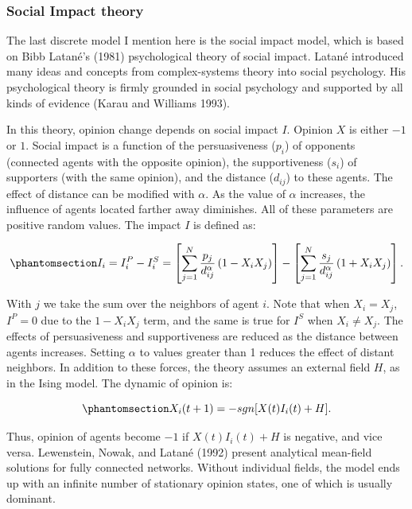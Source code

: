 \documentclass[
  a4paper,
  DIV=11,
  numbers=noendperiod,
  oneside]{scrreprt}
\begin{document}
\subsubsection{Social Impact theory}\label{sec-Social-Impact-theory}

The last discrete model I mention here is the social impact model, which
is based on Bibb Latané's (1981) psychological theory of social impact.
Latané introduced many ideas and concepts from complex-systems theory
into social psychology. His psychological theory is firmly grounded in
social psychology and supported by all kinds of evidence (Karau and
Williams 1993).

In this theory, opinion change depends on social impact \(I\). Opinion
\(X\) is either \(-1\) or \(1\). Social impact is a function of the
persuasiveness (\(p_{i}\)) of opponents (connected agents with the
opposite opinion), the supportiveness (\(s_{i}\)) of supporters (with
the same opinion), and the distance (\(d_{ij}\)) to these agents. The
effect of distance can be modified with \(\alpha\). As the value of
\(\alpha\) increases, the influence of agents located farther away
diminishes. All of these parameters are positive random values. The
impact \(I\) is defined as:

\begin{equation}\phantomsection\label{eq-ch7-SI-a}{I_{i} = I_{i}^{P} - I_{i}^{S} = \left\lbrack \sum_{j = 1}^{N}{\frac{p_{j}}{d_{ij}^{\alpha}}\left( 1 - X_{i}X_{j} \right)} \right\rbrack - \left\lbrack \sum_{j = 1}^{N}{\frac{s_{j}}{d_{ij}^{\alpha}}\left( 1 + X_{i}X_{j} \right)} \right\rbrack.}\end{equation}

With \(j\) we take the sum over the neighbors of agent \(i\). Note that
when \(X_{i} = X_{j}\), \(I^{P} = 0\) due to the \(1 - X_{i}X_{j}\)
term, and the same is true for \(I^{S}\) when \(X_{i} \neq X_{j}\). The
effects of persuasiveness and supportiveness are reduced as the distance
between agents increases. Setting \(\alpha\) to values greater than 1
reduces the effect of distant neighbors. In addition to these forces,
the theory assumes an external field \(H\), as in the Ising model. The
dynamic of opinion is:

\begin{equation}\phantomsection\label{eq-ch7-SI-b}{X_{i}(t + 1) = - sgn\lbrack X(t)I_{i}(t) + H\rbrack.}\end{equation}

Thus, opinion of agents become \(-1\) if \(X(t)I_{i}(t) + H\) is
negative, and vice versa. Lewenstein, Nowak, and Latané (1992) present
analytical mean-field solutions for fully connected networks. Without
individual fields, the model ends up with an infinite number of
stationary opinion states, one of which is usually dominant.
\end{document}
